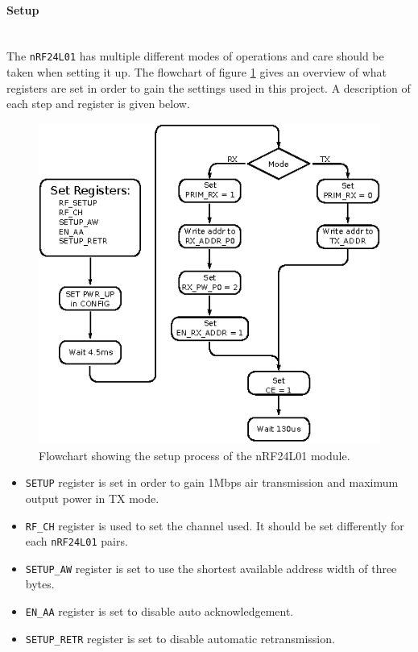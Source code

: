 \paragraph{Setup} %
\label{par:nrfsetup}
~\\
The \texttt{nRF24L01} has multiple different modes of operations and care should be taken when setting it up.
The flowchart of figure \ref{fig:nrf_setup} gives an overview of what registers are set in order to gain the settings used in this project.
A description of each step and register is given below.
\begin{figure}[h]
	\centering
	\includegraphics[width=.8\linewidth]{graphics/nfr_setup}
	\caption{Flowchart showing the setup process of the nRF24L01 module.}
	\label{fig:nrf_setup}
\end{figure}
\begin{itemize}
	\item \texttt{SETUP} register is set in order to gain 1Mbps air transmission and maximum output power in TX mode.
	\item \texttt{RF\_CH} register is used to set the channel used. It should be set differently for each \texttt{nRF24L01} pairs.
	\item \texttt{SETUP\_AW} register is set to use the shortest available address width of three bytes.
	\item \texttt{EN\_AA} register is set to disable auto acknowledgement.
	\item \texttt{SETUP\_RETR} register is set to disable automatic retransmission.
\end{itemize}

